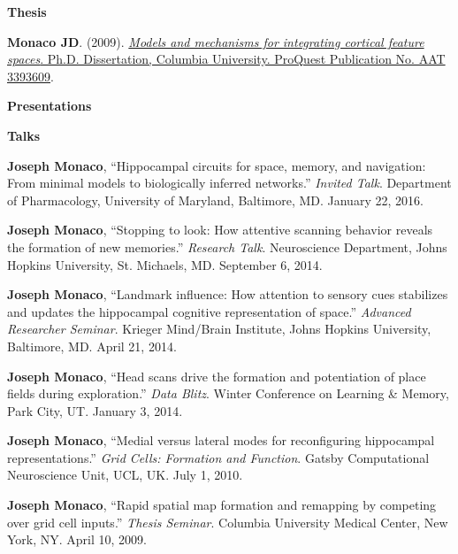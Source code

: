 \documentclass[10pt]{article}
\begin{document}
\pagebreak
{}
{\large \textbf{Thesis}}

\begin{description}
\item \textbf{Monaco JD}. (2009). \href{http://search.proquest.com/docview/304862872/abstract}{\emph{Models and mechanisms for integrating cortical feature spaces}. Ph.D. Dissertation, Columbia University. ProQuest Publication No. AAT 3393609}.
\end{description}

{\large \textbf{Presentations}}

\begin{description}
\item \textbf{Talks}
\item[\quad] \textbf{Joseph Monaco}, ``Hippocampal circuits for space, memory, and navigation: From minimal models to biologically inferred networks.'' \emph{Invited Talk}. Department of Pharmacology, University of Maryland, Baltimore, MD. January 22, 2016.
\item[\quad] \textbf{Joseph Monaco}, ``Stopping to look: How attentive scanning behavior reveals the formation of new memories.'' \emph{Research Talk}. Neuroscience Department, Johns Hopkins University, St. Michaels, MD. September 6, 2014.
\item[\quad] \textbf{Joseph Monaco}, ``Landmark influence: How attention to sensory cues stabilizes and updates the hippocampal cognitive representation of space.'' \emph{Advanced Researcher Seminar}. Krieger Mind/Brain Institute, Johns Hopkins University, Baltimore, MD. April 21, 2014.
\item[\quad] \textbf{Joseph Monaco}, ``Head scans drive the formation and potentiation of place fields during exploration.'' \emph{Data Blitz}. Winter Conference on Learning \& Memory, Park City, UT. January 3, 2014.
\item[\quad] \textbf{Joseph Monaco}, ``Medial versus lateral modes for reconfiguring hippocampal representations.'' \emph{Grid Cells: Formation and Function}. Gatsby Computational Neuroscience Unit, UCL, UK. July 1, 2010.
\item[\quad] \textbf{Joseph Monaco}, ``Rapid spatial map formation and remapping by competing over grid cell inputs.'' \emph{Thesis Seminar}. Columbia University Medical Center, New York, NY. April 10, 2009.
\end{description}
\end{document}

